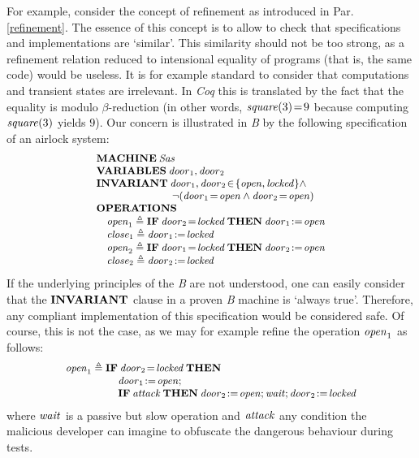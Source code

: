 \documentclass[conference]{IEEEtran}
\begin{document}
For example, consider the concept of refinement as introduced in Par. \ref{refinement}. The
essence of this concept is to allow to check that specifications and implementations are
`similar'. This similarity should not be too strong, as a refinement relation reduced to
intensional equality of programs (that is, the same code) would be useless. It is for example
standard to consider that computations and transient states are irrelevant. In \emph{Coq} this
is translated by the fact that the equality is modulo {\small$\beta$}-reduction (in other
words, {\small$\textrm{\emph{square}}(3)\!=\!9$} because computing {\small$\textrm{\emph{square}}(3)$} yields
{\small$9$}). Our concern is illustrated in \emph{B} by the following specification of an
airlock system:
\[\small\begin{array}{l}
\Cmd{MACHINE}\:\fid{Sas}\\
\Cmd{VARIABLES}\:\fid{door}_1,\fid{door}_2\\
\Cmd{INVARIANT}\:\fid{door}_1,\fid{door}_2\!\in\!\{\fid{open},\fid{locked}\}\land\\
\quad\quad\quad\quad\quad\quad\quad\:
 \lnot(\fid{door}_1\!=\!\fid{open}\land \fid{door}_2\!=\!\fid{open})\\
\Cmd{OPERATIONS}\\
\quad \fid{open}_1\triangleq \Cmd{IF}\:\fid{door}_2\!=\!\fid{locked}\:\Cmd{THEN}\:
  \fid{door}_1\!:=\!\fid{open}\\
\quad \fid{close}_1\triangleq \fid{door}_1\!:=\!\fid{locked}\\
\quad \fid{open}_2\triangleq \Cmd{IF}\:\fid{door}_1\!=\!\fid{locked}\:\Cmd{THEN}\:
  \fid{door}_2\!:=\!\fid{open}\\
\quad \fid{close}_2\triangleq \fid{door}_2\!:=\!\fid{locked}\\
\end{array}\]
If the underlying principles of the \emph{B} are not understood, one can easily consider that
the {\small$\mathbf{INVARIANT}$} clause in a proven \emph{B} machine is `always true'. Therefore,
any compliant implementation of this specification would be considered safe. Of course, this
is not the case, as we may for example refine the operation {\small$\textrm{\emph{open}}_1$} as follows:
\[\small\begin{array}{l}
\fid{open}_1\triangleq \Cmd{IF}\:\fid{door}_2\!=\!\fid{locked}\:\Cmd{THEN}\\
\quad\quad\quad\quad\quad\fid{door}_1\!:=\!\fid{open};\\
\quad\quad\quad\quad\quad\Cmd{IF}\:\fid{attack}\:\Cmd{THEN}\:
\fid{door}_2\!:=\!\fid{open};\fid{wait};\fid{door}_2\!:=\!\fid{locked}
\end{array}\]
where {\small$\textrm{\emph{wait}}$} is a passive but slow operation and {\small$\textrm{\emph{attack}}$} any
condition the malicious developer can imagine to obfuscate the dangerous behaviour during
tests.
\end{document}
